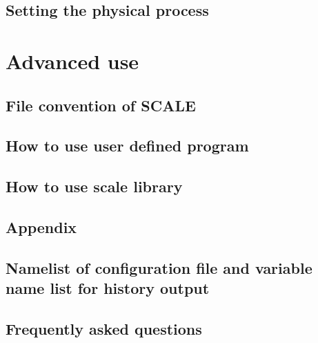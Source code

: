 \documentclass[a4paper]{report}
\begin{document}
 \chapter{Setting the physical process} \label{sec:basic_usel_physics}

\part{Advanced use} \label{chap:advance_use}
 \chapter{File convention of SCALE}
 \chapter{How to use user defined program}
 \chapter{How to use scale library}





\begin{appendix}
\part{Appendix}
\chapter{Namelist of configuration file and variable name list for history output} \label{achap:namelist}

\chapter{Frequently asked questions} \label{achap:practice}


\end{appendix}


\ClearWallPaper

\end{document}
